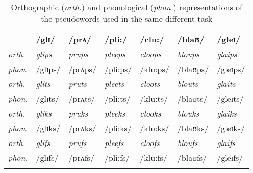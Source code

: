 \begin{table}[H]\fontsize{10}{11}
\caption{Orthographic (\textit{orth.}) and phonological (\textit{phon.}) representations of the pseudowords used in the same-different task}
\label{tab:6.1}
\centering
\begin{tabular}{lllllll} 
\lsptoprule
~              & /glɪ/          & /prʌ/          & /pli:/          & /clu:/          & /blaʊ/          & /gleɪ/           \\ 
\midrule
\textit{orth.} & \textit{glips} & \textit{prups} & \textit{pleeps} & \textit{cloops} & \textit{bloups} & \textit{glaips}  \\
\textit{phon.} & /glɪps/        & /prʌps/        & /pli:ps/        & /klu:ps/        & /blaʊps/        & /gleɪps/         \\ 
\midrule
\textit{orth.} & \textit{glits} & \textit{pruts} & \textit{pleets} & \textit{cloots} & \textit{blouts} & \textit{glaits}  \\
\textit{phon.} & /glɪts/        & /prʌts/        & /pli:ts/        & /klu:ts/        & /blaʊts/        & /gleɪts/         \\ 
\midrule
\textit{orth.} & \textit{gliks} & \textit{pruks} & \textit{pleeks} & \textit{clooks} & \textit{blouks} & \textit{glaiks}  \\
\textit{phon.} & /glɪks/        & /prʌks/        & /pli:ks/        & /klu:ks/        & /blaʊks/        & /gleɪks/         \\ 
\midrule
\textit{orth.} & \textit{glifs} & \textit{prufs} & \textit{pleefs} & \textit{cloofs} & \textit{bloufs} & \textit{glaifs}  \\
\textit{phon.} & /glɪfs/        & /prʌfs/        & /pli:fs/        & /klu:fs/        & /blaʊfs/        & /gleɪfs/         \\
\lspbottomrule
\end{tabular}
\end{table}




